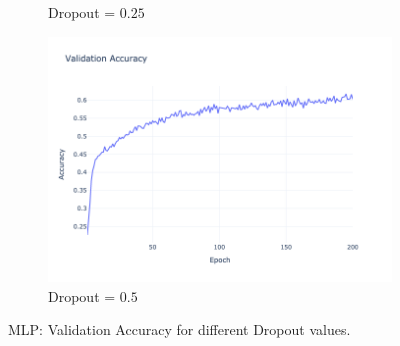 \begin{figure}[htbp!]
\begin{subfigure}{0.32\textwidth}
        \caption{Dropout = $0.25$}
    \end{subfigure}
    \begin{subfigure}{0.32\textwidth}
        \centering
        \includegraphics[width=\textwidth]{images/mlp-validation-accuracy-batch-64-lr-0.002-epochs-200-hidden-200-dropout-0.5-l2-0.0-layers-2-act-relu-opt-sgd-mom-0.0.png}
        \caption{Dropout = $0.5$}
    \end{subfigure}
    \caption{MLP: Validation Accuracy for different Dropout values.}
    \label{fig:mlp_dropout_acc}
\end{figure}

\clearpage

